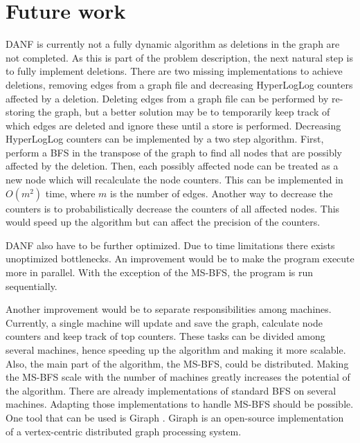 \section{Future work}
\label{sec:future_work}
DANF is currently not a fully dynamic algorithm as deletions in the graph are not completed. As this is part of the problem description, the next natural step is to fully implement deletions. There are two missing implementations to achieve deletions, removing edges from a graph file and decreasing HyperLogLog counters affected by a deletion. Deleting edges from a graph file can be performed by re-storing the graph, but a better solution may be to temporarily keep track of which edges are deleted and ignore these until a store is performed. Decreasing HyperLogLog counters can be implemented by a two step algorithm. First, perform a BFS in the transpose of the graph to find all nodes that are possibly affected by the deletion. Then, each possibly affected node can be treated as a new node which will recalculate the node counters. This can be implemented in $O(m^2)$ time, where $m$ is the number of edges. Another way to decrease the counters is to probabilistically decrease the counters of all affected nodes. This would speed up the algorithm but can affect the precision of the counters.

DANF also have to be further optimized. Due to time limitations there exists unoptimized bottlenecks. An improvement would be to make the program execute more in parallel. With the exception of the MS-BFS, the program is run sequentially. 

Another improvement would be to separate responsibilities among machines. Currently, a single machine will update and save the graph, calculate node counters and keep track of top counters. These tasks can be divided among several machines, hence speeding up the algorithm and making it more scalable. Also, the main part of the algorithm, the MS-BFS, could be distributed. Making the MS-BFS scale with the number of machines greatly increases the potential of the algorithm. There are already implementations of standard BFS on several machines. Adapting those implementations to handle MS-BFS should be possible. One tool that can be used is Giraph \cite{giraph}. Giraph is an open-source implementation of a vertex-centric distributed graph processing system.